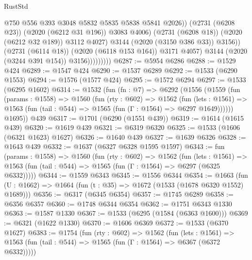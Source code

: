 \begin{lexlean}{RustStd}
\begin{coremodule}
                                    @750
                                    @556
                                    @393
                                    @3048
                                    @5832
                                    @5835
                                    @5838
                                    @5841
                                    @2026))
                                (@2731 (@6208 @23))
                                (@2020 (@6212 @31 @196))
                                @3083
                                @4006)
                              (@2731 (@6208 @18))
                              (@2020 (@6212 @32 @189))
                              @3112
                              @4027)
                            @3144
                            (@2020 (@3150 @386 @33))
                            @3156))
                        (@2731 (@6114 @18))
                        (@2020 (@6118 @153 @164))
                        @3171
                        @4057)
                      @3144
                      (@2020 (@3244 @391 @154))
                      @3156)))))))))
@6287 := @5954 @6286
@6288 := @1529 @424
@6289 := @1547 @424
@6290 := @1537 @6289
@6292 := @1533 (@6290 @1553)
@6294 := @1576 (@1577 @424)
@6295 := @1572 @6294
@6297 := @1533 (@6295 @1602)
@6314 := @1532
    (fun (fn : @7) =>
    @6292
      (@1556
        (@1559
          (fun (params : @1558) =>
          @1560
            (fun (rty : @602) =>
            @1562
              (fun (lets : @1561) =>
              @1563 (fun (tail : @544) => @1565 (fun (Γ : @1564) => @6297 @1649))))))
        @1695))
    @439
@6317 := @1701 (@6290 (@1551 @439))
@6319 := @1614 (@1615 @439)
@6320 := @1619 @439
@6321 := @6319 @6320
@6325 := @1533 (@1606 (@6321 @1623) @1627)
@6326 := @1640 @439
@6327 := @1639 @6326
@6328 := @1643 @439
@6332 := @1637 (@6327 @6328 @1595 @1597)
@6343 := fun (params : @1558) =>
  @1560
    (fun (rty : @602) =>
    @1562
      (fun (lets : @1561) =>
      @1563 (fun (tail : @544) => @1565 (fun (Γ : @1564) => @6297 (@6325 @6332)))))
@6344 := @1559 @6343
@6345 := @1556 @6344
@6354 := @1663 (fun (U : @1662) => @1664 (fun (t : @35) => @1672 (@1533 (@1678 @6320 @1552) @1689)))
@6356 := @6317 (@6345 @6354)
@6357 := @1745 @6289
@6358 := @6356 @6357
@6360 := @1748 @6344 @6354
@6362 := @1751 @6343 @1330
@6363 := @1587 @1330
@6367 := @1533 (@6295 (@1584 (@6363 @1600)))
@6369 := @6321 (@1622 @1330)
@6370 := @1606 @6369
@6372 := @1533 (@6370 @1627)
@6383 := @1754
    (fun (rty : @602) =>
    @1562
      (fun (lets : @1561) =>
      @1563 (fun (tail : @544) => @1565 (fun (Γ : @1564) => @6367 (@6372 @6332)))))

\end{coremodule}
\end{lexlean}
